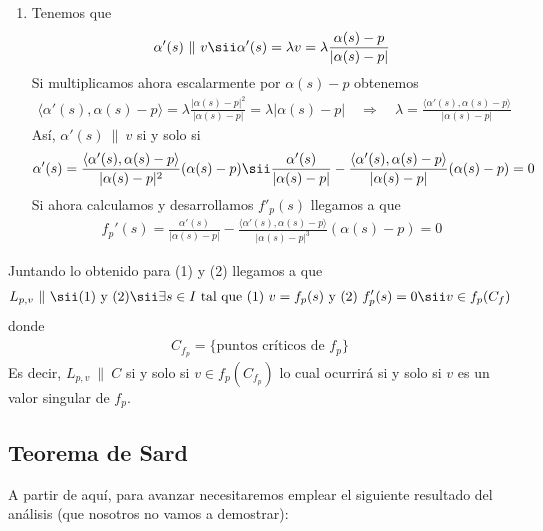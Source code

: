 \begin{observacion}
\begin{enumerate}[label=(\arabic*)]
        \item Tenemos que 
        \begin{gather*}
            \alpha'(s) \ \| \ v \sii \alpha'(s)=\lambda v = \lambda \frac{\alpha(s) - p}{|\alpha(s)-p|} 
        \end{gather*}
        Si multiplicamos ahora escalarmente por $\alpha(s) - p$ obtenemos
        \begin{gather*}
            \langle \alpha'(s), \alpha(s) - p \rangle = \lambda \frac{|\alpha(s)-p|^2}{|\alpha(s)-p|} = \lambda |\alpha(s)-p| \quad \Rightarrow \quad \lambda = \frac{\langle \alpha'(s), \alpha(s) - p \rangle}{|\alpha(s) - p|}
        \end{gather*}
        Así, $\alpha'(s) \ \| \ v$ si y solo si 
        \begin{gather*}
            \alpha'(s) = \frac{\langle \alpha'(s), \alpha(s) - p\rangle}{|\alpha(s) - p |^2}(\alpha(s)-p) \sii \frac{\alpha'(s)}{|\alpha(s) - p|} - \frac{\langle \alpha'(s), \alpha(s) - p\rangle}{|\alpha(s) - p|}(\alpha(s) -p) = 0
        \end{gather*}
        Si ahora calculamos y desarrollamos $f'_p(s)$ llegamos a que 
        \begin{gather*}
            f_p'(s) = \frac{\alpha'(s)}{|\alpha(s) - p|} - \frac{\langle \alpha'(s), \alpha(s) - p \rangle}{|\alpha(s) - p|^3}(\alpha(s) - p) = 0
        \end{gather*}
    \end{enumerate}
    Juntando lo obtenido para (1) y (2) llegamos a que 
    \begin{gather*}
        L_{p,v} \ \| \ \sii (1) \text{ y } (2) \sii \exists s \in I \text{ tal que (1) } v=f_p(s) \text{ y (2) } f_p'(s)=0 \sii v\in f_p(C_f)
    \end{gather*}
    donde
    \begin{gather*}
        C_{f_p}=\{\text{puntos críticos de $f_p$}\}
    \end{gather*}
    Es decir, $L_{p,v}\ \| \ C$ si y solo si $v\in f_p(C_{f_p})$ lo cual ocurrirá si y solo si $v$ es un valor singular de $f_p$.\\
\end{observacion}
\subsection{Teorema de Sard}
A partir de aquí, para avanzar necesitaremos emplear el siguiente resultado del análisis (que nosotros no vamos a demostrar):

